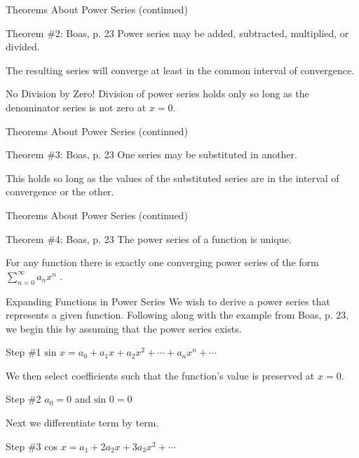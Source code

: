 \documentclass{beamer}
\begin{document}
\begin{frame}{Theorems About Power Series (continued)}
	\begin{block}{Theorem \#2: Boas, p. 23}
		Power series may be added, subtracted, multiplied, or divided.
	\end{block}
	The resulting series will converge at least in the common interval of convergence.
	\begin{alertblock}{No Division by Zero!}
		Division of power series holds only so long as the denominator series is not zero at $x=0$.
	\end{alertblock}
\end{frame}
  
\begin{frame}{Theorems About Power Series (continued)}
	\begin{block}{Theorem \#3: Boas, p. 23}
		One series may be substituted in another.
	\end{block}
	This holds so long as the values of the substituted series are in the interval of convergence or the other.
\end{frame}
  
\begin{frame}{Theorems About Power Series (continued)}
	\begin{block}{Theorem \#4: Boas, p. 23}
		The power series of a function is unique.
	\end{block}
	For any function there is exactly one converging power series of the form $\sum_{n=0}^\infty a_nx^n$ .
\end{frame}
  
\begin{frame}{Expanding Functions in Power Series}
	We wish to derive a power series that represents a given function.  Following along with the example from Boas, p. 23, we begin this by assuming that the power series exists.
	\begin{exampleblock}{Step \#1}
	$\mbox{sin\ } x = a_0 + a_1x + a_2x^2+\cdots +a_nx^n+\cdots$
	\end{exampleblock}
	We then select coefficients such that the function's value is preserved at $x=0$.
	\begin{exampleblock}{Step \#2}
	$a_0=0$ and $\mbox{sin\ }0=0$
	\end{exampleblock}
	Next we differentiate term by term.
	\begin{exampleblock}{Step \#3}
	cos $x=a_1+2a_2x+3a_3x^2+\cdots$
	\end{exampleblock}
\end{frame}
  
\end{document}
